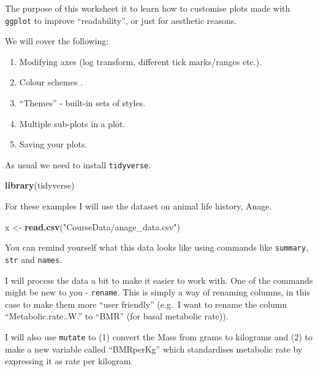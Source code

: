 \documentclass[
  a4paperpaper,
]{book}
\newenvironment{Shaded}{\begin{snugshade}}{\end{snugshade}}
\newcommand{\KeywordTok}[1]{\textcolor[rgb]{0.13,0.29,0.53}{\textbf{#1}}}
\newcommand{\NormalTok}[1]{#1}
\newcommand{\StringTok}[1]{\textcolor[rgb]{0.31,0.60,0.02}{#1}}
\providecommand{\tightlist}{%
  \setlength{\itemsep}{0pt}\setlength{\parskip}{0pt}}
\begin{document}
The purpose of this worksheet it to learn how to customise plots made with \texttt{ggplot} to improve ``readability'', or just for aesthetic reasons.

We will cover the following:

\begin{enumerate}
\def\labelenumi{\arabic{enumi}.}
\tightlist
\item
  Modifying axes (log transform, different tick marks/ranges etc.).
\item
  Colour schemes .
\item
  ``Themes'' - built-in sets of styles.
\item
  Multiple sub-plots in a plot.
\item
  Saving your plots.
\end{enumerate}

As usual we need to install \texttt{tidyverse}.

\begin{Shaded}
\begin{Highlighting}[]
\KeywordTok{library}\NormalTok{(tidyverse)}
\end{Highlighting}
\end{Shaded}

For these examples I will use the dataset on animal life history, Anage.

\begin{Shaded}
\begin{Highlighting}[]
\NormalTok{x \textless{}{-}}\StringTok{ }\KeywordTok{read.csv}\NormalTok{(}\StringTok{"CourseData/anage\_data.csv"}\NormalTok{)}
\end{Highlighting}
\end{Shaded}

You can remind yourself what this data looks like using commands like \texttt{summary}, \texttt{str} and \texttt{names}.

I will process the data a bit to make it easier to work with. One of the commands might be new to you - \texttt{rename}. This is simply a way of renaming columns, in this case to make them more ``user friendly'' (e.g.~I want to rename the column ``Metabolic.rate..W.'' to ``BMR'' (for basal metabolic rate)).

I will also use \texttt{mutate} to (1) convert the Mass from grams to kilograms and (2) to make a new variable called ``BMRperKg'' which standardises metabolic rate by expressing it as rate per kilogram.
\end{document}
